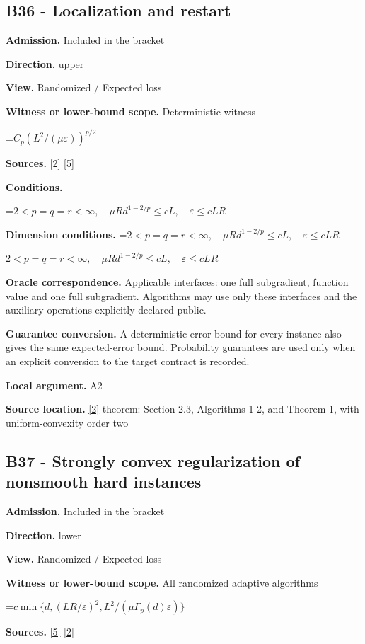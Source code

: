 \documentclass[10pt,a4paper]{article}
\newcommand{\AtlasMath}[1]{\par\begingroup\centering\setbox0=\hbox{$\displaystyle #1$}\ifdim\wd0>1.4\linewidth\typeout{ATLAS WIDE FORMULA: \the\wd0}\fi\ifdim\wd0>\linewidth\resizebox{\linewidth}{!}{\box0}\else\box0\fi\par\endgroup}
\newcommand{\AtlasInlineMath}[1]{\begingroup\setbox0=\hbox{$#1$}\ifdim\wd0>.4\linewidth\endgroup\AtlasMath{#1}\else\endgroup$#1$\fi}
\begin{document}
\subsection{B36 - Localization and restart}
\textbf{Admission.} Included in the bracket

\textbf{Direction.} upper

\textbf{View.} Randomized / Expected loss

\textbf{Witness or lower-bound scope.} Deterministic witness

\AtlasMath{C_p(L^2/(\mu\varepsilon))^{p/2}}
\textbf{Sources.} \href{https://arxiv.org/pdf/1401.1792}{[2]} \href{https://arxiv.org/pdf/1407.5144}{[5]}

\textbf{Conditions.} 
\AtlasMath{2<p=q=r<\infty,\quad\mu R d^{1-2/p}\le cL,\quad\varepsilon\le cLR}


\textbf{Dimension conditions.} \AtlasInlineMath{2<p=q=r<\infty,\quad\mu R d^{1-2/p}\le cL,\quad\varepsilon\le cLR}

\textbf{Oracle correspondence.} Applicable interfaces: one full subgradient, function value and one full subgradient. Algorithms may use only these interfaces and the auxiliary operations explicitly declared public.

\textbf{Guarantee conversion.} A deterministic error bound for every instance also gives the same expected-error bound. Probability guarantees are used only when an explicit conversion to the target contract is recorded.

\textbf{Local argument.} A2

\textbf{Source location.} \href{https://arxiv.org/pdf/1401.1792}{[2]} theorem: Section 2.3, Algorithms 1-2, and Theorem 1, with uniform-convexity order two

\subsection{B37 - Strongly convex regularization of nonsmooth hard instances}
\textbf{Admission.} Included in the bracket

\textbf{Direction.} lower

\textbf{View.} Randomized / Expected loss

\textbf{Witness or lower-bound scope.} All randomized adaptive algorithms

\AtlasMath{c\min\{d,(LR/\varepsilon)^2,L^2/(\mu\Gamma_p(d)\varepsilon)\}}
\textbf{Sources.} \href{https://arxiv.org/pdf/1407.5144}{[5]} \href{https://arxiv.org/pdf/1401.1792}{[2]}
\end{document}
